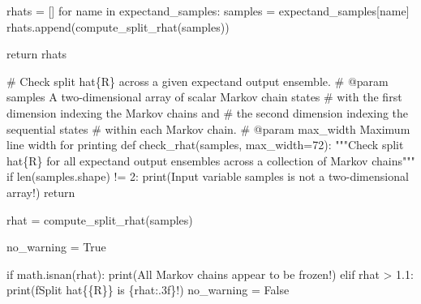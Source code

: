 \documentclass[
  letterpaper,
  DIV=11,
  numbers=noendperiod]{scrartcl}
\newenvironment{Shaded}{\begin{snugshade}}{\end{snugshade}}
\newcommand{\BuiltInTok}[1]{\textcolor[rgb]{0.00,0.23,0.31}{#1}}
\newcommand{\CharTok}[1]{\textcolor[rgb]{0.13,0.47,0.30}{#1}}
\newcommand{\CommentTok}[1]{\textcolor[rgb]{0.37,0.37,0.37}{#1}}
\newcommand{\ControlFlowTok}[1]{\textcolor[rgb]{0.00,0.23,0.31}{#1}}
\newcommand{\DecValTok}[1]{\textcolor[rgb]{0.68,0.00,0.00}{#1}}
\newcommand{\FloatTok}[1]{\textcolor[rgb]{0.68,0.00,0.00}{#1}}
\newcommand{\KeywordTok}[1]{\textcolor[rgb]{0.00,0.23,0.31}{#1}}
\newcommand{\NormalTok}[1]{\textcolor[rgb]{0.00,0.23,0.31}{#1}}
\newcommand{\OperatorTok}[1]{\textcolor[rgb]{0.37,0.37,0.37}{#1}}
\newcommand{\SpecialCharTok}[1]{\textcolor[rgb]{0.37,0.37,0.37}{#1}}
\newcommand{\SpecialStringTok}[1]{\textcolor[rgb]{0.13,0.47,0.30}{#1}}
\newcommand{\StringTok}[1]{\textcolor[rgb]{0.13,0.47,0.30}{#1}}
\newcommand{\VariableTok}[1]{\textcolor[rgb]{0.07,0.07,0.07}{#1}}
\begin{document}
\begin{Shaded}
\begin{Highlighting}[]
\NormalTok{  rhats }\OperatorTok{=}\NormalTok{ []}
  \ControlFlowTok{for}\NormalTok{ name }\KeywordTok{in}\NormalTok{ expectand\_samples:}
\NormalTok{    samples }\OperatorTok{=}\NormalTok{ expectand\_samples[name]}
\NormalTok{    rhats.append(compute\_split\_rhat(samples))}
  
  \ControlFlowTok{return}\NormalTok{ rhats}

\CommentTok{\# Check split hat\{R\} across a given expectand output ensemble.}
\CommentTok{\# @param samples A two{-}dimensional array of scalar Markov chain states }
\CommentTok{\#                with the first dimension indexing the Markov chains and }
\CommentTok{\#                the second dimension indexing the sequential states }
\CommentTok{\#                within each Markov chain.}
\CommentTok{\# @param max\_width Maximum line width for printing}
\KeywordTok{def}\NormalTok{ check\_rhat(samples, max\_width}\OperatorTok{=}\DecValTok{72}\NormalTok{):}
  \CommentTok{"""Check split hat\{R\} for all expectand output ensembles across}
\CommentTok{     a collection of Markov chains"""}
  \ControlFlowTok{if} \BuiltInTok{len}\NormalTok{(samples.shape) }\OperatorTok{!=} \DecValTok{2}\NormalTok{:}
    \BuiltInTok{print}\NormalTok{(}\StringTok{\textquotesingle{}Input variable \textasciigrave{}samples\textasciigrave{} is not a two{-}dimensional array!\textquotesingle{}}\NormalTok{)}
    \ControlFlowTok{return}
    
\NormalTok{  rhat }\OperatorTok{=}\NormalTok{ compute\_split\_rhat(samples)}

\NormalTok{  no\_warning }\OperatorTok{=} \VariableTok{True}
  
  \ControlFlowTok{if}\NormalTok{ math.isnan(rhat):}
    \BuiltInTok{print}\NormalTok{(}\StringTok{\textquotesingle{}All Markov chains appear to be frozen!\textquotesingle{}}\NormalTok{)}
  \ControlFlowTok{elif}\NormalTok{ rhat }\OperatorTok{\textgreater{}} \FloatTok{1.1}\NormalTok{:}
    \BuiltInTok{print}\NormalTok{(}\SpecialStringTok{f\textquotesingle{}Split hat}\CharTok{\{\{}\SpecialStringTok{R}\CharTok{\}\}}\SpecialStringTok{ is }\SpecialCharTok{\{}\NormalTok{rhat}\SpecialCharTok{:.3f\}}\SpecialStringTok{!\textquotesingle{}}\NormalTok{)}
\NormalTok{    no\_warning }\OperatorTok{=} \VariableTok{False}
 

\end{Highlighting}
\end{Shaded}
\end{document}
